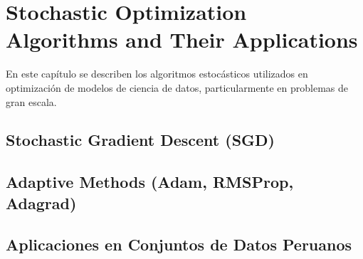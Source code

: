\chapter{Stochastic Optimization Algorithms and Their Applications}
\label{chap:2}

En este capítulo se describen los algoritmos estocásticos utilizados 
en optimización de modelos de ciencia de datos, particularmente 
en problemas de gran escala.

\section{Stochastic Gradient Descent (SGD)}

\section{Adaptive Methods (Adam, RMSProp, Adagrad)}

\section{Aplicaciones en Conjuntos de Datos Peruanos}

